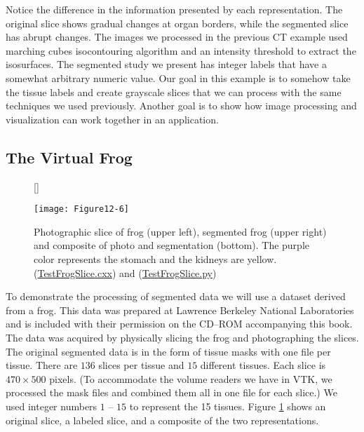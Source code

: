 Notice the difference in the information presented by each representation. The original slice shows gradual changes at organ borders, while the segmented slice has abrupt changes. The images we processed in the previous CT example used marching cubes isocontouring algorithm and an intensity threshold to extract the isosurfaces. The segmented study we present has integer labels that have a somewhat arbitrary numeric value. Our goal in this example is to somehow take the tissue labels and create grayscale slices that we can process with the same techniques we used previously. Another goal is to show how image processing and visualization can work together in an application.

\subsection{The Virtual Frog}

\begin{figure}[!htb]
    [\FBwidth]
    {\caption{Photographic slice of frog (upper left), segmented frog (upper right) and composite of photo and segmentation (bottom). The purple color represents the stomach and the kidneys are yellow.(\href{https://lorensen.github.io/VTKExamples/site/Cxx/Visualization/TestFrogSlice/}{TestFrogSlice.cxx}) and (\href{https://lorensen.github.io/VTKExamples/site/Python/Visualization/TestFrogSlice/}{TestFrogSlice.py})}\label{fig:Figure12-6}}
    {\texttt{[image: Figure12-6]}}
\end{figure}

To demonstrate the processing of segmented data we will use a dataset derived from a frog. This data was prepared at Lawrence Berkeley National Laboratories and is included with their permission on the CD--ROM accompanying this book. The data was acquired by physically slicing the frog and photographing the slices. The original segmented data is in the form of tissue masks with one file per tissue. There are $136$ slices per tissue and $15$ different tissues. Each slice is $470 \times 500$ pixels. (To accommodate the volume readers we have in VTK, we processed the mask files and combined them all in one file for each slice.) We used integer numbers $1$ -- $15$ to represent the 15 tissues. Figure \ref{fig:Figure12-6} shows an original slice, a labeled slice, and a composite of the two representations.

